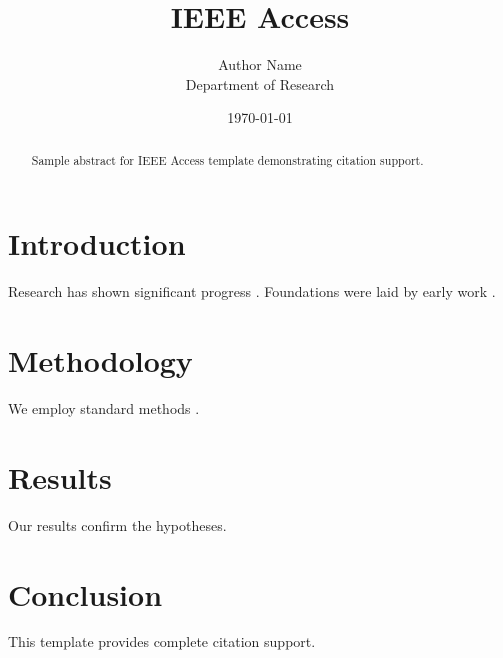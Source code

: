 ﻿\documentclass{IEEEtran}
\title{IEEE Access}
\author{Author Name \\ \small Department of Research}
\date{\today}
\begin{document}
\maketitle

\begin{abstract}
Sample abstract for IEEE Access template demonstrating citation support.
\end{abstract}

\section{Introduction}
Research has shown significant progress \citep{einstein1905}. Foundations were laid by early work \citep{turing1950}.

\section{Methodology}
We employ standard methods \citep{knuth1984}.

\section{Results}
Our results confirm the hypotheses.

\section{Conclusion}
This template provides complete citation support.



\end{document}
